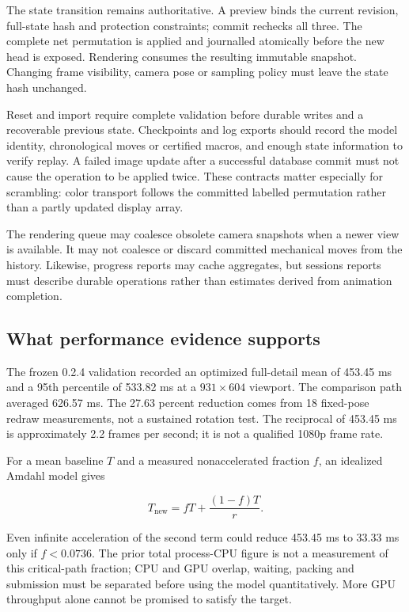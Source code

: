 \documentclass[
  10pt,
  a4paper,
]{article}
\begin{document}
The state transition remains authoritative. A preview binds the current
revision, full-state hash and protection constraints; commit rechecks
all three. The complete net permutation is applied and journalled
atomically before the new head is exposed. Rendering consumes the
resulting immutable snapshot. Changing frame visibility, camera pose or
sampling policy must leave the state hash unchanged.

Reset and import require complete validation before durable writes and a
recoverable previous state. Checkpoints and log exports should record
the model identity, chronological moves or certified macros, and enough
state information to verify replay. A failed image update after a
successful database commit must not cause the operation to be applied
twice. These contracts matter especially for scrambling: color transport
follows the committed labelled permutation rather than a partly updated
display array.

The rendering queue may coalesce obsolete camera snapshots when a newer
view is available. It may not coalesce or discard committed mechanical
moves from the history. Likewise, progress reports may cache aggregates,
but sessions reports must describe durable operations rather than
estimates derived from animation completion.

\subsection{What performance evidence
supports}\label{what-performance-evidence-supports}

The frozen 0.2.4 validation recorded an optimized full-detail mean of
453.45 ms and a 95th percentile of 533.82 ms at a \(931\times604\)
viewport. The comparison path averaged 626.57 ms. The 27.63 percent
reduction comes from 18 fixed-pose redraw measurements, not a sustained
rotation test. The reciprocal of 453.45 ms is approximately 2.2 frames
per second; it is not a qualified 1080p frame rate.

For a mean baseline \(T\) and a measured nonaccelerated fraction \(f\),
an idealized Amdahl model gives

\begin{equation}
T_{\mathrm{new}}=fT+\frac{(1-f)T}{r}.
\end{equation}

Even infinite acceleration of the second term could reduce 453.45 ms to
33.33 ms only if \(f<0.0736\). The prior total process-CPU figure is not
a measurement of this critical-path fraction; CPU and GPU overlap,
waiting, packing and submission must be separated before using the model
quantitatively. More GPU throughput alone cannot be promised to satisfy
the target.
\end{document}
